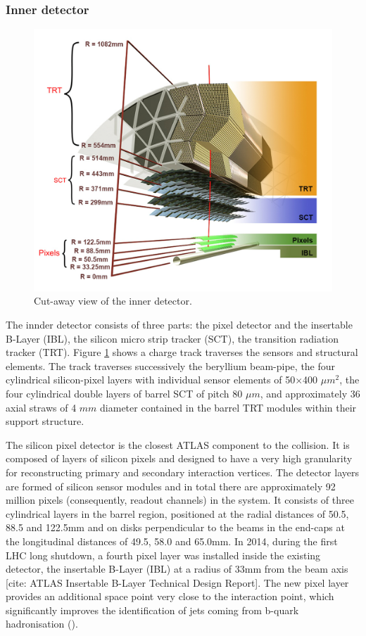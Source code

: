 \documentclass[letterpaper,12pt]{article}
\begin{document}
	
\subsubsection{Inner detector}

			
	\begin{figure}[]
		\begin{centering}	
		\includegraphics[width=.4\textwidth]{Detector_plots/Inner detector.png}
		\caption{Cut-away view of the inner detector.}
		\label{fig:inner_detector}
		\end{centering}
	\end{figure}
	The innder detector consists of three parts: the pixel detector and
	the insertable B-Layer (IBL),
	the silicon micro strip tracker (SCT), the transition radiation
	tracker (TRT). 
	Figure \ref{fig:inner_detector} shows a 
	charge track traverses the sensors and structural
	elements. 
	The track traverses successively the beryllium
	beam-pipe, the four cylindrical silicon-pixel layers 
	with individual 
	sensor elements of 50$\times$400 $\mu m^2$, the four cylindrical double 
	layers of barrel SCT of pitch 80 $\mu m$, 
	and approximately 36 axial straws of 4 $mm$ diameter 
	contained in the barrel TRT
	modules within their support structure.

	The silicon pixel detector is the closest ATLAS 
	component to the collision. It is composed of layers of
	silicon pixels and designed to have a very 
	high granularity for reconstructing primary 
	and secondary interaction vertices. 
	The detector layers are formed of silicon sensor modules and 
	in total there are approximately 92 million pixels 
	(consequently, readout channels) in the system.
	It consists of three cylindrical layers in the 
	barrel region, positioned at the radial distances of 
	50.5, 88.5 and 122.5mm 
	and on disks perpendicular to the beams in the end-caps at the
	longitudinal distances of 49.5, 58.0 and 65.0mm. 
	In 2014, during the first LHC long shutdown, a fourth pixel 
	layer was installed inside the existing detector, 
	the insertable B-Layer (IBL) at a radius of 33mm 
	from the beam axis [cite: ATLAS Insertable B-Layer Technical Design Report].
	The new pixel layer provides an 
	additional space point very close to the interaction point, 
	which significantly improves the identification of jets coming from 
	b-quark hadronisation (\bjets). 
\end{document}

